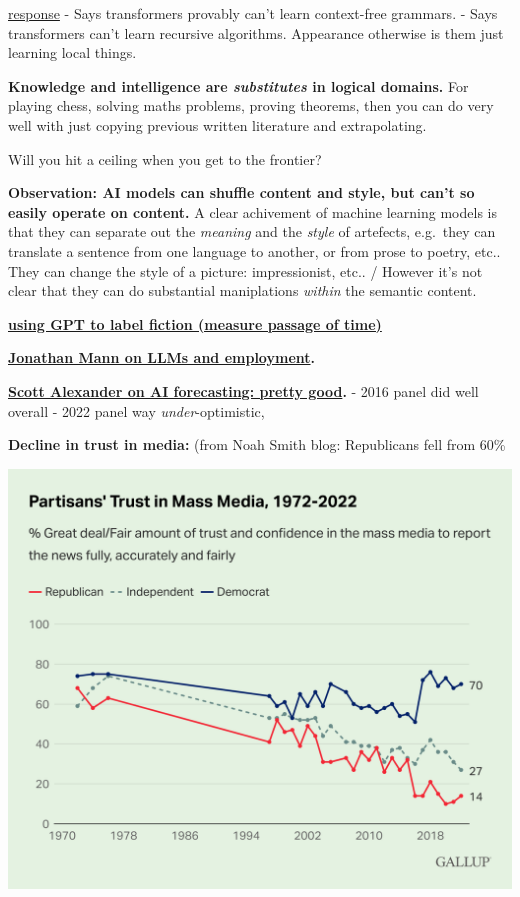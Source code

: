 \documentclass[
  11pt,
  letterpaper,
  DIV=11,
  numbers=noendperiod,
  oneside]{scrartcl}
\begin{document}
\href{https://twitter.com/xuanalogue/status/1666765447054647297}{response}
- Says transformers provably can't learn context-free grammars. - Says
transformers can't learn recursive algorithms. Appearance otherwise is
them just learning local things.

\textbf{Knowledge and intelligence are \emph{substitutes} in logical
domains.} For playing chess, solving maths problems, proving theorems,
then you can do very well with just copying previous written literature
and extrapolating.

Will you hit a ceiling when you get to the frontier?

\textbf{Observation: AI models can shuffle content and style, but can't
so easily operate on content.} A clear achivement of machine learning
models is that they can separate out the \emph{meaning} and the
\emph{style} of artefects, e.g.~they can translate a sentence from one
language to another, or from prose to poetry, etc.. They can change the
style of a picture: impressionist, etc.. / However it's not clear that
they can do substantial maniplations \emph{within} the semantic content.

\textbf{\href{https://tedunderwood.com/2023/03/19/using-gpt-4-to-measure-the-passage-of-time-in-fiction/}{using
GPT to label fiction (measure passage of time)}}

\textbf{\href{https://asteriskmag.com/issues/03/ai-isn-t-coming-for-tech-jobs-yet?utm_source=substack\&utm_medium=email}{Jonathan
Mann on LLMs and employment}.}

\textbf{\href{https://asteriskmag.com/issues/03/through-a-glass-darkly}{Scott
Alexander on AI forecasting: pretty good}.} - 2016 panel did well
overall - 2022 panel way \emph{under}-optimistic,

\textbf{Decline in trust in media:} (from Noah Smith blog: Republicans
fell from 60\%

\includegraphics{images/2023-06-28-20-43-31.png}
\end{document}

